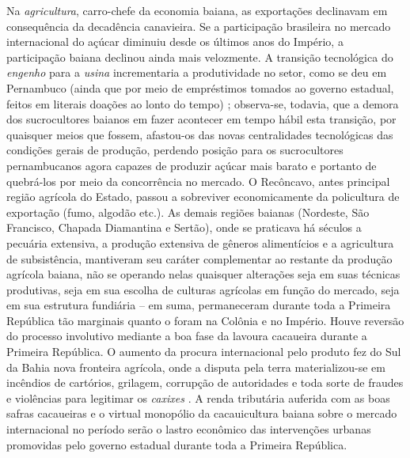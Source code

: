 Na \textit{agricultura}, carro-chefe da economia baiana, as exportações declinavam em consequência da decadência canavieira. Se a participação brasileira no mercado internacional do açúcar diminuiu desde os últimos anos do Império, a participação baiana declinou ainda mais velozmente. A transição tecnológica do \textit{engenho} para a \textit{usina} incrementaria a produtividade no setor, como se deu em Pernambuco (ainda que por meio de empréstimos tomados ao governo estadual, feitos em literais doações ao lonto do tempo) \cite[p.~31]{gorender_burguesia_1990}; observa-se, todavia, que a demora dos sucrocultores baianos em fazer acontecer em tempo hábil esta transição, por quaisquer meios que fossem, afastou-os das novas centralidades tecnológicas das condições gerais de produção, perdendo posição para os sucrocultores pernambucanos agora capazes de produzir açúcar mais barato e portanto de quebrá-los por meio da concorrência no mercado. O Recôncavo, antes principal região agrícola do Estado, passou a sobreviver economicamente da policultura de exportação (fumo, algodão etc.). As demais regiões baianas (Nordeste, São Francisco, Chapada Diamantina e Sertão), onde se praticava há séculos a pecuária extensiva, a produção extensiva de gêneros alimentícios e a agricultura de subsistência, mantiveram seu caráter complementar ao restante da produção agrícola baiana, não se operando nelas quaisquer alterações seja em suas técnicas produtivas, seja em sua escolha de culturas agrícolas em função do mercado, seja em sua estrutura fundiária -- em suma, permaneceram durante toda a Primeira República tão marginais quanto o foram na Colônia e no Império. Houve reversão do processo involutivo mediante a boa fase da lavoura cacaueira durante a Primeira República. O aumento da procura internacional pelo produto fez do Sul da Bahia nova fronteira agrícola, onde a disputa pela terra materializou-se em incêndios de cartórios, grilagem, corrupção de autoridades e toda sorte de fraudes e violências para legitimar os \textit{caxixes} \cite[pp.~78-79]{CPE1980}. A renda tributária auferida com as boas safras cacaueiras e o virtual monopólio da cacauicultura baiana sobre o mercado internacional no período serão o lastro econômico das intervenções urbanas promovidas pelo governo estadual durante toda a Primeira República.


